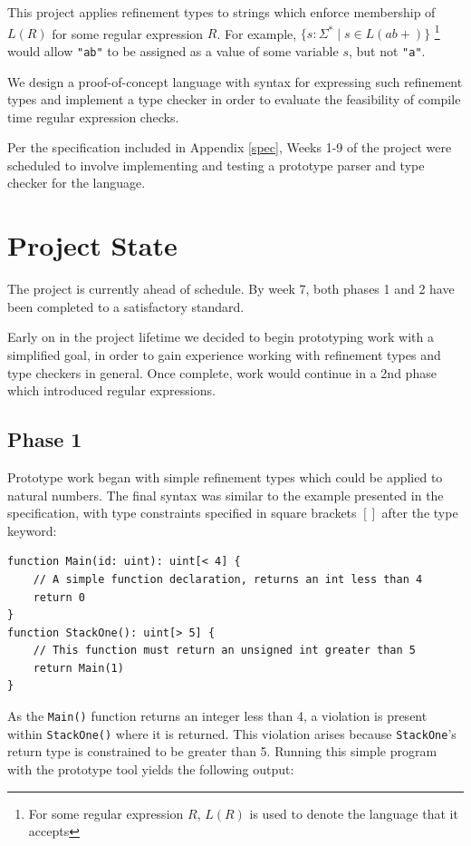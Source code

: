 \documentclass[a4paper]{article}
\begin{document}
    This project applies refinement types to strings which enforce membership of $L(R)$ for some regular expression $R$. For example, $\{s: \Sigma^* \mid s \in L(ab+)\}$ \footnote{For some regular expression $R$, $L(R)$ is used to denote the language that it accepts} would allow \texttt{"ab"} to be assigned as a value of some variable $s$, but not \texttt{"a"}.
    
    We design a proof-of-concept language with syntax for expressing such refinement types and implement a type checker in order to evaluate the feasibility of compile time regular expression checks.

    Per the specification included in Appendix \ref{spec}, Weeks 1-9 of the project were scheduled to involve implementing and testing a prototype parser and type checker for the language.
    
    \section{Project State}
    
    The project is currently ahead of schedule. By week 7, both phases 1 and 2 have been completed to a satisfactory standard.
    
    Early on in the project lifetime we decided to begin prototyping work with a simplified goal, in order to gain experience working with refinement types and type checkers in general. Once complete, work would continue in a 2nd phase which introduced regular expressions.
    
    \subsection*{Phase 1}\hfill
    
    Prototype work began with simple refinement types which could be applied to natural numbers. The final syntax was similar to the example presented in the specification, with type constraints specified in square brackets $[ ]$ after the type keyword:
    
    \begin{verbatim}
function Main(id: uint): uint[< 4] {
    // A simple function declaration, returns an int less than 4
    return 0
}
function StackOne(): uint[> 5] {
    // This function must return an unsigned int greater than 5
    return Main(1)
}
    \end{verbatim}
    
    As the \texttt{Main()} function returns an integer less than 4, a violation is present within \texttt{StackOne()} where it is returned. This violation arises because \texttt{StackOne}'s return type is constrained to be greater than 5.
    \pagebreak[5]
    Running this simple program with the prototype tool yields the following output:
    
\end{document}
